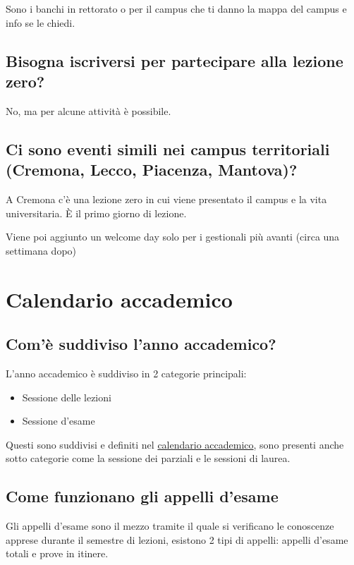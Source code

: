 \documentclass[legal]{polinetwork}
\begin{document}
Sono i banchi in rettorato o per il campus che ti danno la mappa del campus e info se le chiedi.

\subsection{Bisogna iscriversi per partecipare alla lezione zero?}


No, ma per alcune attività è possibile.

\subsection{Ci sono eventi simili nei campus territoriali (Cremona, Lecco, Piacenza, Mantova)?}


A Cremona c'è una lezione zero in cui viene presentato il campus e la vita universitaria. È il primo giorno di lezione.

Viene poi aggiunto un welcome day solo per i gestionali più avanti (circa una settimana dopo)

\section{Calendario accademico}


\subsection{Com'è suddiviso l'anno accademico?}


L'anno accademico è suddiviso in 2 categorie principali:

\begin{itemize}
  \item Sessione delle lezioni
  \item Sessione d'esame
\end{itemize}


Questi sono suddivisi e definiti nel \href{https://www.polimi.it/studenti/calendari-e-scadenze}{calendario accademico}, sono presenti anche sotto categorie come la sessione dei parziali e le sessioni di laurea.

\subsection{Come funzionano gli appelli d'esame}


Gli appelli d'esame sono il mezzo tramite il quale si verificano le conoscenze apprese durante il semestre di lezioni, esistono 2 tipi di appelli: appelli d'esame totali e prove in itinere.
\end{document}
